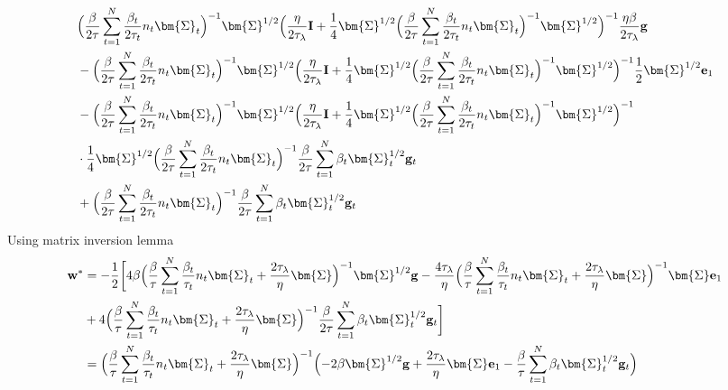 \documentclass[final]{l4dc2026}
\newcommand{\bSigma}{\bm{\Sigma}}
\newcommand{\bI}{\mathbf{I}}
\newcommand{\be}{\mathbf{e}}
\newcommand{\bg}{\mathbf{g}}
\newcommand{\bw}{\mathbf{w}}
\begin{document}
\begin{align*}
    &\Bigl(\frac{\beta}{2\tau}\sum_{t=1}^N \frac{\beta_t}{2\tau_t} n_t \bSigma_t \Bigr)^{-1} \bSigma^{1/2}\Bigl(\frac{\eta}{2\tau_{\lambda}}\bI+\frac{1}{4}\bSigma^{1/2} \Bigl(\frac{\beta}{2\tau}\sum_{t=1}^N \frac{\beta_t}{2\tau_t} n_t \bSigma_t \Bigr)^{-1}\bSigma^{1/2}\Bigr)^{-1} \frac{\eta \beta}{2\tau_{\lambda}} \bg \\
    &- \Bigl(\frac{\beta}{2\tau}\sum_{t=1}^N \frac{\beta_t}{2\tau_t} n_t \bSigma_t \Bigr)^{-1} \bSigma^{1/2} \Bigl(\frac{\eta}{2\tau_{\lambda}}\bI+\frac{1}{4}\bSigma^{1/2} \Bigl(\frac{\beta}{2\tau}\sum_{t=1}^N \frac{\beta_t}{2\tau_t} n_t \bSigma_t \Bigr)^{-1}\bSigma^{1/2}\Bigr)^{-1} \frac{1}{2} \bSigma^{1/2} \be_1 \\
    &- \Bigl(\frac{\beta}{2\tau}\sum_{t=1}^N \frac{\beta_t}{2\tau_t} n_t \bSigma_t \Bigr)^{-1} \bSigma^{1/2} \Bigl(\frac{\eta}{2\tau_{\lambda}}\bI+\frac{1}{4}\bSigma^{1/2} \Bigl(\frac{\beta}{2\tau}\sum_{t=1}^N \frac{\beta_t}{2\tau_t} n_t \bSigma_t \Bigr)^{-1}\bSigma^{1/2}\Bigr)^{-1} \\ 
    & \cdot \frac{1}{4}\bSigma^{1/2} \Bigl(\frac{\beta}{2\tau}\sum_{t=1}^N \frac{\beta_t}{2\tau_t} n_t \bSigma_t \Bigr)^{-1} \frac{\beta}{2\tau}\sum_{t=1}^N \beta_t \bSigma_t^{1/2}\bg_t \\
    &+\Bigl(\frac{\beta}{2\tau}\sum_{t=1}^N \frac{\beta_t}{2\tau_t} n_t \bSigma_t \Bigr)^{-1}\frac{\beta}{2\tau}\sum_{t=1}^N \beta_t \bSigma_t^{1/2}\bg_t
\end{align*}
Using matrix inversion lemma
\begin{align*}
    \bw^\ast &= -\frac{1}{2}\biggl[4\beta \Bigl(  \frac{\beta}{\tau}\sum_{t=1}^N \frac{\beta_t}{\tau_t} n_t \bSigma_t + \frac{2\tau_{\lambda}}{\eta} \bSigma \Bigr)^{-1} \bSigma^{1/2} \bg -  \frac{4\tau_{\lambda}}{\eta} \Bigl(  \frac{\beta}{\tau}\sum_{t=1}^N \frac{\beta_t}{\tau_t} n_t \bSigma_t + \frac{2\tau_{\lambda}}{\eta} \bSigma \Bigr)^{-1} \bSigma \be_1\\
    &+ 4 \Bigl(  \frac{\beta}{\tau}\sum_{t=1}^N \frac{\beta_t}{\tau_t} n_t \bSigma_t + \frac{2\tau_{\lambda}}{\eta} \bSigma \Bigr)^{-1} \frac{\beta}{2\tau}\sum_{t=1}^N \beta_t \bSigma_t^{1/2}\bg_t \biggr] \\
    &= \Bigl(  \frac{\beta}{\tau}\sum_{t=1}^N \frac{\beta_t}{\tau_t} n_t \bSigma_t + \frac{2\tau_{\lambda}}{\eta} \bSigma \Bigr)^{-1} \Bigl( - 2 \beta \bSigma^{1/2} \bg + \frac{2 \tau_{\lambda}}{\eta} \bSigma \be_1 -  \frac{\beta}{\tau} \sum_{t=1}^N \beta_t \bSigma_t^{1/2}\bg_t \Bigr)
\end{align*}
\end{document}
